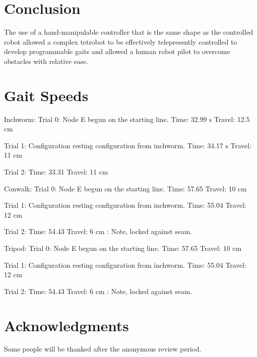 \documentclass[conference]{IEEEtran}
\begin{document}
\section{Conclusion}
\label{sec:conclusion}

The use of a hand-manipulable controller that is the same shape
as the controlled robot allowed a complex tetrobot to be effectively
telepresently
controlled to develop programmable gaits and allowed a human
robot pilot to overcome obstacles with relative ease.

\section{Gait Speeds}
Inchworm:
Trial 0:
Node E begun on the starting line.
Time:  32.99 s
Travel: 12.5 cm

Trial 1:
Configuration resting configuration from inchworm.
Time: 34.17 s
Travel: 11 cm

Trial 2:
Time: 33.31
Travel: 11 cm

Conwalk:
Trial 0:
Node E begun on the starting line.
Time: 57.65
Travel: 10 cm

Trial 1:
Configuration resting configuration from inchworm.
Time: 55.04
Travel: 12 cm

Trial 2:
Time: 54.43
Travel: 6 cm : Note, locked against seam.

Tripod:
Trial 0:
Node E begun on the starting line.
Time: 57.65
Travel: 10 cm

Trial 1:
Configuration resting configuration from inchworm.
Time: 55.04
Travel: 12 cm

Trial 2:
Time: 54.43
Travel: 6 cm : Note, locked against seam.



\section*{Acknowledgments}

Some people will be thanked after the anonymous review period.




\end{document}
